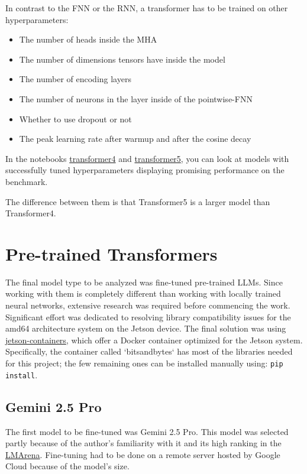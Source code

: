 \documentclass{article}
\begin{document}
In contrast to the FNN or the RNN, a transformer has to be trained on other hyperparameters:
\begin{itemize}
    \item The number of heads inside the MHA
    \item The number of dimensions tensors have inside the model
    \item The number of encoding layers
    \item The number of neurons in the layer inside of the pointwise-FNN
    \item Whether to use dropout or not
    \item The peak learning rate after warmup and after the cosine decay
\end{itemize}


In the notebooks \href{https://github.com/AntonStantan/matura/blob/main/transformer/transformer4.ipynb}{transformer4} and \href{https://github.com/AntonStantan/matura/blob/main/transformer/transformer5.ipynb}{transformer5}, you can look at models with successfully tuned hyperparameters displaying promising performance on the benchmark.

The difference between them is that Transformer5 is a larger model than Transformer4.

\section{Pre-trained Transformers}

The final model type to be analyzed was fine-tuned pre-trained LLMs. Since working with them is completely different than working with locally trained neural networks, extensive research was required before commencing the work.
\\[1em]
Significant effort was dedicated to resolving library compatibility issues for the amd64 architecture system on the Jetson device. The final solution was using \href{https://github.com/dusty-nv/jetson-containers}{jetson-containers}, which offer a Docker container optimized for the Jetson system. Specifically, the container called `bitsandbytes` has most of the libraries needed for this project; the few remaining ones can be installed manually using: \texttt{pip install}.


\subsection{Gemini 2.5 Pro}
The first model to be fine-tuned was Gemini 2.5 Pro. This model was selected partly because of the author's familiarity with it and its high ranking in the \href{https://lmarena.ai/leaderboard}{LMArena}.
Fine-tuning had to be done on a remote server hosted by Google Cloud because of the model's size.
\end{document}
